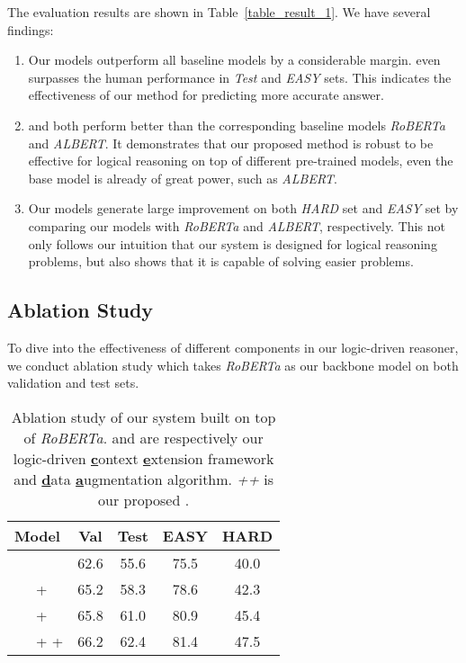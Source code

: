 \documentclass[11pt,a4paper]{article}
\begin{document}
The evaluation results are shown in Table~\ref{table_result_1}. We have several findings:
\begin{enumerate}[-]
    \setlength{\itemsep}{1pt}
    \setlength{\parskip}{1pt}

    \item Our models outperform all baseline models by a considerable margin. \emph{} even surpasses the human performance in \emph{Test} and \emph{EASY} sets.
This indicates the effectiveness of our method for predicting more accurate answer.
    
    \item \emph{} and \emph{} both perform better than the corresponding baseline models \emph{RoBERTa} and \emph{ALBERT}. It demonstrates that our proposed method is robust to be effective for logical reasoning on top of different pre-trained models, even the base model is already of great power, such as \emph{ALBERT}.
    
    \item Our models generate large improvement on both \emph{HARD} set and \emph{EASY} set by comparing our models
with \emph{RoBERTa} and \emph{ALBERT}, respectively. This not only follows our intuition that our system is designed for logical reasoning problems, but also shows that it is capable of solving easier problems. 
    
\end{enumerate}

\subsection{Ablation Study}
To dive into the effectiveness of different components in our logic-driven reasoner, we conduct ablation study which takes \emph{RoBERTa} as our backbone model on both validation and test sets.
\begin{table}[!th]
    \newcommand{\tabincell}[2]{\begin{tabular}{@{}#1@{}}#2\end{tabular}}
	\centering
	\begin{tabular}{l|cccc}
	\toprule
    \bf Model & \bf Val & \bf Test & \bf EASY & \bf HARD \\
	\midrule
     & 62.6 & 55.6 & 75.5 & 40.0 \\
    \ \ \ +  & 65.2 & 58.3 & 78.6 & 42.3 \\
    \ \ \ +  & 65.8 & 61.0 & 80.9 & 45.4 \\
    \ \ \ +  +  & 66.2 & 62.4 & 81.4 & 47.5 \\
	\bottomrule
 	\end{tabular}
	\caption{Ablation study of our system built on top of \emph{RoBERTa}. \emph{} and \emph{} are respectively our logic-driven \underline{\bf c}ontext \underline{\bf e}xtension framework and \underline{\bf d}ata \underline{\bf a}ugmentation algorithm. \emph{++} is our proposed \emph{}.}
	\label{table_ablation}
\end{table}
\end{document}
